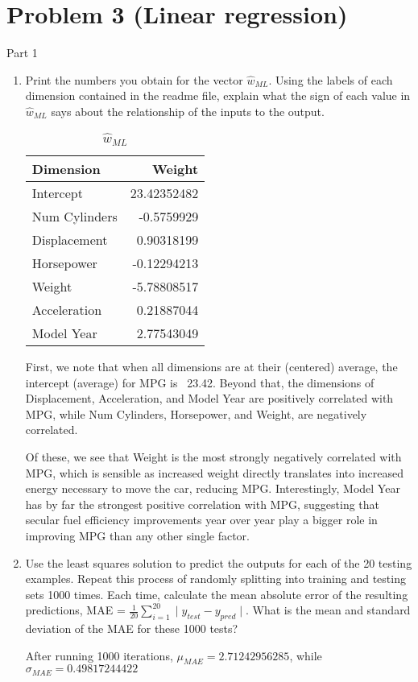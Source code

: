 \documentclass[11pt]{article}
\begin{document}
\section*{Problem 3 (Linear regression)}

Part 1
\begin{enumerate}
\item Print the numbers you obtain for the vector $\hat w_{ML}$. Using the labels of each dimension contained in the readme file, explain what the sign of each value in $\hat w_{ML}$ says about the relationship of the inputs to the output.

\begin{table}[!th]
\centering
\begin{tabular}{|l|r|}
\hline
Dimension & Weight \\
\hline
Intercept & 23.42352482 \\
Num Cylinders & -0.5759929  \\
Displacement & 0.90318199 \\
Horsepower & -0.12294213 \\
Weight & -5.78808517 \\
Acceleration & 0.21887044 \\
Model Year & 2.77543049 \\
\hline
\end{tabular}
\caption{$\hat w_{ML}$}
\label{ex:table}
\end{table}

First, we note that when all dimensions are at their (centered) average, the intercept (average) for MPG is ~23.42. Beyond that, the dimensions of Displacement, Acceleration, and Model Year are positively correlated with MPG, while Num Cylinders, Horsepower, and Weight, are negatively correlated.

Of these, we see that Weight is the most strongly negatively correlated with MPG, which is sensible as increased weight directly translates into increased energy necessary to move the car, reducing MPG. Interestingly, Model Year has by far the strongest positive correlation with MPG, suggesting that secular fuel efficiency improvements year over year play a bigger role in improving MPG than any other single factor. 

\item Use the least squares solution to predict the outputs for each of the 20 testing examples. Repeat this process of randomly splitting into training and testing sets 1000 times. Each time, calculate the mean absolute error of the resulting predictions, MAE = $\frac{1}{20} \sum_{i=1}^{20} \mid y_{test} - y_{pred} \mid$. What is the mean and standard deviation of the MAE for these 1000 tests?

After running 1000 iterations, $\mu_{MAE} = 2.71242956285$, while $\sigma_{MAE} = 0.49817244422$

\end{enumerate}
\end{document}
